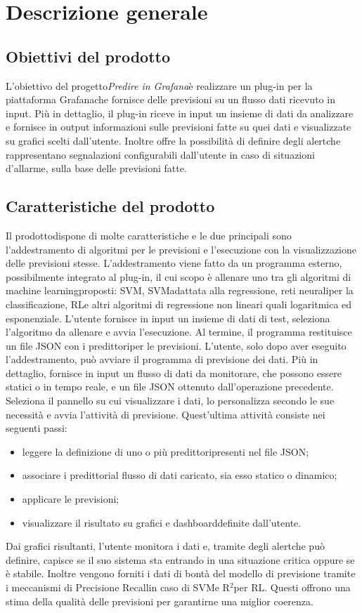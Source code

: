 \section{Descrizione generale}
	\subsection{Obiettivi del prodotto}
	L'obiettivo del progetto\glosp \textit{Predire in Grafana}\glosp è realizzare un plug-in per la piattaforma Grafana\glosp che fornisce delle previsioni su un flusso dati ricevuto in input.
	Più in dettaglio, il plug-in riceve in input un insieme di dati da analizzare e fornisce in output informazioni sulle previsioni fatte su quei dati e visualizzate su grafici scelti dall'utente. Inoltre offre la possibilità di definire degli alert\glosp che rappresentano segnalazioni configurabili dall'utente in caso di situazioni d'allarme, sulla base delle previsioni fatte. 
	\subsection{Caratteristiche del prodotto}
	Il prodotto\glosp dispone di molte caratteristiche e le due principali sono l'addestramento di algoritmi per le previsioni e l'esecuzione con la visualizzazione delle previsioni stesse.
	L'addestramento viene fatto da un programma esterno, possibilmente integrato al plug-in, il cui scopo è allenare uno tra gli algoritmi di machine learning\glosp proposti: SVM\glo, SVM\glosp adattata alla regressione, reti neurali\glosp per la classificazione, RL\glosp e altri algoritmi di regressione non lineari quali logaritmica ed esponenziale. L'utente fornisce in input un insieme di dati di test, seleziona l'algoritmo da allenare e avvia l'esecuzione. Al termine, il programma restituisce un file JSON con i predittori\glosp per le previsioni.
	L'utente, solo dopo aver eseguito l'addestramento, può avviare il programma di previsione dei dati. Più in dettaglio, fornisce in input un flusso di dati da monitorare, che possono essere statici o in tempo reale, e un file JSON ottenuto dall'operazione precedente. Seleziona il pannello su cui visualizzare i dati, lo personalizza secondo le sue necessità e avvia l'attività di previsione. Quest'ultima attività consiste nei seguenti passi:
	\begin{itemize}
		\item leggere la definizione di uno o più predittori\glosp presenti nel file JSON;
		\item associare i predittori\glosp al flusso di dati caricato, sia esso statico o dinamico;
		\item applicare le previsioni;
		\item visualizzare il risultato su grafici e dashboard\glosp definite dall'utente.
	\end{itemize}
	Dai grafici risultanti, l'utente monitora i dati e, tramite degli alert\glosp che può definire, capisce se il suo sistema sta entrando in una situazione critica oppure se è stabile.
	Inoltre vengono forniti i dati di bontà del modello di previsione tramite i meccanismi di Precision\glosp e Recall\glosp in caso di SVM\glosp e R$^{2}$\glosp per RL\glo. Questi offrono una stima della qualità delle previsioni per garantirne una miglior coerenza.
